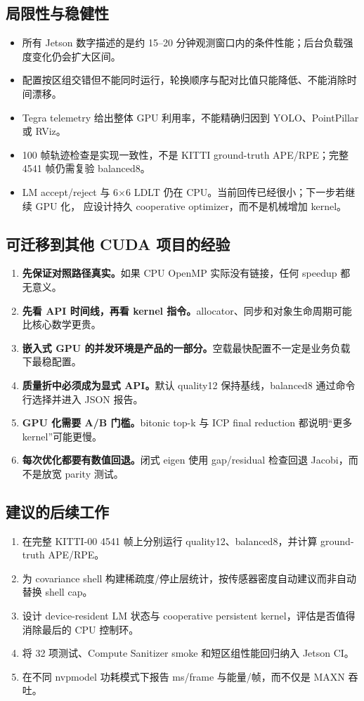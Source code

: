 \documentclass[UTF8,a4paper,11pt,fontset=none]{ctexart}
\begin{document}
\subsection{局限性与稳健性}

\begin{itemize}
  \item 所有 Jetson 数字描述的是约 15--20 分钟观测窗口内的条件性能；后台负载强度变化仍会扩大区间。
  \item 配置按区组交错但不能同时运行，轮换顺序与配对比值只能降低、不能消除时间漂移。
  \item Tegra telemetry 给出整体 GPU 利用率，不能精确归因到 YOLO、PointPillar 或 RViz。
  \item 100 帧轨迹检查是实现一致性，不是 KITTI ground-truth APE/RPE；完整 4541 帧仍需复验 balanced8。
  \item LM accept/reject 与 6×6 LDLT 仍在 CPU。当前回传已经很小；下一步若继续 GPU 化，
        应设计持久 cooperative optimizer，而不是机械增加 kernel。
\end{itemize}

\subsection{可迁移到其他 CUDA 项目的经验}

\begin{enumerate}
  \item \textbf{先保证对照路径真实。}如果 CPU OpenMP 实际没有链接，任何 speedup 都无意义。
  \item \textbf{先看 API 时间线，再看 kernel 指令。}allocator、同步和对象生命周期可能比核心数学更贵。
  \item \textbf{嵌入式 GPU 的并发环境是产品的一部分。}空载最快配置不一定是业务负载下最稳配置。
  \item \textbf{质量折中必须成为显式 API。}默认 quality12 保持基线，balanced8 通过命令行选择并进入 JSON 报告。
  \item \textbf{GPU 化需要 A/B 门槛。}bitonic top-k 与 ICP final reduction 都说明“更多 kernel”可能更慢。
  \item \textbf{每次优化都要有数值回退。}闭式 eigen 使用 gap/residual 检查回退 Jacobi，而不是放宽 parity 测试。
\end{enumerate}

\subsection{建议的后续工作}

\begin{enumerate}
  \item 在完整 KITTI-00 4541 帧上分别运行 quality12、balanced8，并计算 ground-truth APE/RPE。
  \item 为 covariance shell 构建稀疏度/停止层统计，按传感器密度自动建议而非自动替换 shell cap。
  \item 设计 device-resident LM 状态与 cooperative persistent kernel，评估是否值得消除最后的 CPU 控制环。
  \item 将 32 项测试、Compute Sanitizer smoke 和短区组性能回归纳入 Jetson CI。
  \item 在不同 nvpmodel 功耗模式下报告 ms/frame 与能量/帧，而不仅是 MAXN 吞吐。
\end{enumerate}
\end{document}
